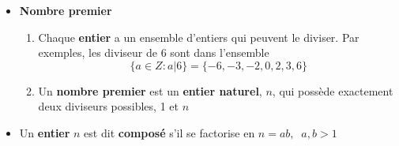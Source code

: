 \documentclass[16pt]{report}
\begin{document}
\begin{multicols*}{2}
\begin{itemize}
                \item \textbf{\textcolor{myp}{Nombre premier}}
                    \begin{enumerate}
                        \item Chaque  \textbf{entier} a un ensemble d'entiers qui peuvent le diviser. Par exemples,
                            les diviseur de $6$ sont dans l'ensemble 
                            \[ \{ a \in Z : a | 6 \} = \{ -6, -3, -2, 0, 2, 3, 6\} \]
                        \item Un \textbf{\textcolor{myb}{nombre premier}}  est un \textbf{entier naturel}, $n$, qui possède 
                            exactement deux diviseurs possibles, 1 et $n$
                    \end{enumerate}
                
                \item Un  \textbf{entier} $n$ est dit \textbf{\textcolor{myb}{composé}} s'il se factorise en 
                    $n = ab, \;\;a,b > 1$ 


\end{itemize}
\end{multicols*}
\end{document}
